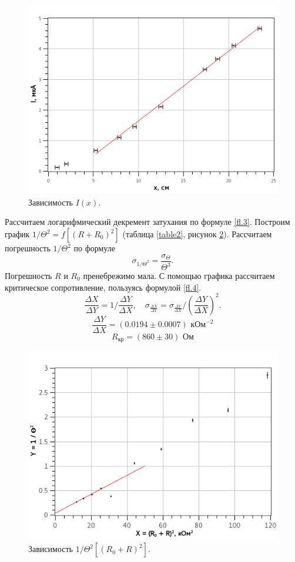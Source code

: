 \documentclass{article}
\begin{document}
   
   \begin{figure}[h]
   \centering
   \includegraphics[width=12cm]{plot1.png} 
   \caption{Зависимость $I(x)$.} 
   \label{plot.1} 
   \end{figure}

   Рассчитаем логарифмический декремент затухания по формуле \eqref{fl.3}. Построим график $1/\Theta^2 = f\left[ (R + R_0)^2 \right]$ (таблица \ref{table2}, рисунок \ref{plot.2}). Рассчитаем погрешность $1 / \Theta^2$ по формуле
   \[
       \sigma_{1/\Theta^2} = \frac{\sigma_\Theta}{\Theta^3}.
   \]
   Погрешность $R$ и $R_0$ пренебрежимо мала. С помощью графика рассчитаем критическое сопротивление, пользуясь формулой \eqref{fl.4}.
   \[
      \frac{\Delta X}{\Delta Y} = 1 / \frac{\Delta Y}{\Delta X}, \quad \sigma_{\frac{\Delta X}{\Delta Y}} = \sigma_{\frac{\Delta Y}{\Delta X}} / \left(\frac{\Delta Y}{\Delta X}\right)^2.
   \]
   \[
      \frac{\Delta Y}{\Delta X} = (0.0194 \pm 0.0007) \text{ кОм}^{-2}
   \]
   \[
      R_{\text{кр}} = (860 \pm 30) \text{ Ом}
   \]

   
   \begin{figure}[h]
   \centering
   \includegraphics[width=12cm]{plot2.png} 
   \caption{Зависимость $1 / \Theta^2\left[ (R_0 + R)^2 \right]$.} 
   \label{plot.2} 
   \end{figure}
\end{document}
